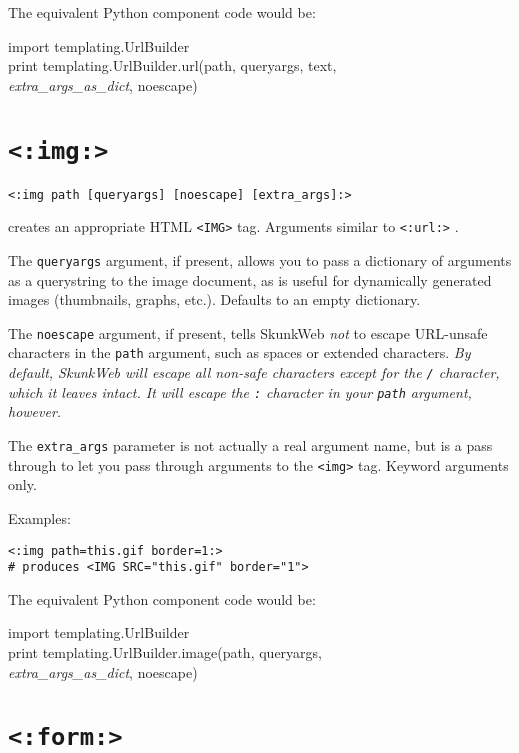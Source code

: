 \documentclass{manual}
\begin{document}
{{\begin{itemize}
\end{itemize}

The equivalent Python component code would be:
\begin{obeylines}\ttfamily
import templating.UrlBuilder
print templating.UrlBuilder.url(path, queryargs, text,
     \textit{extra_args_as_dict}, noescape)
\end{obeylines}



\section{\texttt{<:img:>}}
\label{tagimg}

\begin{verbatim}<:img path [queryargs] [noescape] [extra_args]:>\end{verbatim}

creates an appropriate HTML \texttt{<IMG>} tag. 
Arguments similar to \texttt{<:url:>} . 

The \texttt{queryargs} argument, if present, allows you to pass a
dictionary of arguments as a querystring to the image document, as
is useful for dynamically generated images (thumbnails, graphs,
etc.). Defaults to an empty dictionary.

The \texttt{noescape} argument, if present,
tells SkunkWeb \emph{not} to escape URL-unsafe characters in the \texttt{path}
argument, such as spaces or extended characters. \emph{By default,
SkunkWeb will escape all non-safe characters except for the \texttt{/}
character, which it leaves intact. It will escape the \texttt{:}
character in your \texttt{path} argument, however.}

The \texttt{extra_args} parameter is not actually a real argument name, 
but is a pass through to let you pass through arguments to 
the \texttt{<img>} tag.  Keyword arguments only.

Examples:

\begin{verbatim}<:img path=this.gif border=1:>
# produces <IMG SRC="this.gif" border="1">
\end{verbatim}

The equivalent Python component code would be:
\begin{obeylines}\ttfamily
import templating.UrlBuilder
print templating.UrlBuilder.image(path, queryargs,
     \textit{extra_args_as_dict}, noescape)
\end{obeylines}


\section{\texttt{<:form:>}}
\label{tagform}

}}
\end{document}
